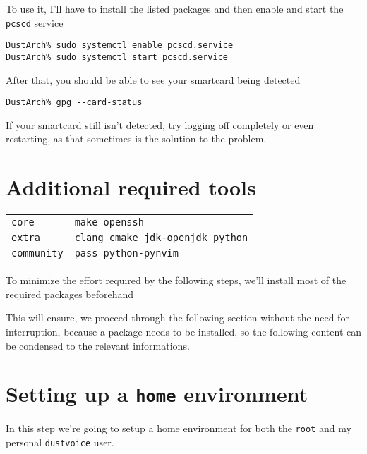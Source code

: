 \documentclass[9pt]{report}
\newenvironment{NOTE}
{\begin{tcolorbox}[colback=admonitionBG,coltitle=draculaFG,colframe=draculaBlue,colbacktitle=draculaBlue,title=NOTE]}
{\end{tcolorbox}}
\newenvironment{packagetable}
{\begin{longtabu}to \textwidth [b]{X[1,r]|X[1,l]}}
{\end{longtabu}}
\begin{document}
To use it, I’ll have to install the listed packages and then enable and start the \texttt{pcscd} service


\begin{verbatim}
DustArch% sudo systemctl enable pcscd.service
DustArch% sudo systemctl start pcscd.service
\end{verbatim}

After that, you should be able to see your smartcard being detected


\begin{verbatim}
DustArch% gpg --card-status
\end{verbatim}

\begin{NOTE}
    If your smartcard still isn’t detected, try logging off completely or even restarting, as that sometimes is the solution to the problem.

\end{NOTE}

\newpage

\hypertarget{x-additional-required-tools}{\section{Additional required tools}}
\begin{packagetable}
    \texttt{core} & \texttt{make openssh} \\ 
    \texttt{extra} & \texttt{clang cmake jdk-openjdk python} \\ 
    \texttt{community} & \texttt{pass python-pynvim} \\ 
\end{packagetable}

To minimize the effort required by the following steps, we’ll install most of the required packages beforehand


This will ensure, we proceed through the following section without the need for interruption, because a package needs to be installed, so the following content can be condensed to the relevant informations.



\newpage

\hypertarget{x-setting-up-a-home-environment}{\section{Setting up a \texttt{home} environment}}
In this step we’re going to setup a home environment for both the \texttt{root} and my personal \texttt{dustvoice} user.
\end{document}
